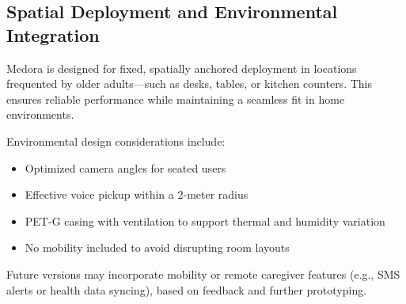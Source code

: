 \subsection{Spatial Deployment and Environmental Integration}

Medora is designed for fixed, spatially anchored deployment in locations frequented by older adults—such as desks, tables, or kitchen counters. This ensures reliable performance while maintaining a seamless fit in home environments.

Environmental design considerations include:

\begin{itemize}
    \item Optimized camera angles for seated users
    \item Effective voice pickup within a 2-meter radius
    \item PET-G casing with ventilation to support thermal and humidity variation
    \item No mobility included to avoid disrupting room layouts
\end{itemize}

Future versions may incorporate mobility or remote caregiver features (e.g., SMS alerts or health data syncing), based on feedback and further prototyping.

